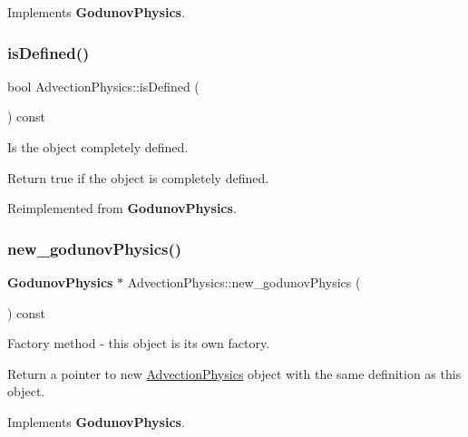 Implements \textbf{ Godunov\+Physics}.

\mbox{\label{class_advection_physics_a92b160c02d12974644e65dce3b7945b9}} 
\subsubsection{\texorpdfstring{is\+Defined()}{isDefined()}}
{\footnotesize\ttfamily bool Advection\+Physics\+::is\+Defined (\begin{DoxyParamCaption}{ }\end{DoxyParamCaption}) const\hspace{0.3cm}{\ttfamily [virtual]}}



Is the object completely defined. 

Return true if the object is completely defined. 

Reimplemented from \textbf{ Godunov\+Physics}.

\mbox{\label{class_advection_physics_aa5be4c1a0a10aa2bbbe87fc6b032f2b4}} 
\subsubsection{\texorpdfstring{new\+\_\+godunov\+Physics()}{new\_godunovPhysics()}}
{\footnotesize\ttfamily \textbf{ Godunov\+Physics} $\ast$ Advection\+Physics\+::new\+\_\+godunov\+Physics (\begin{DoxyParamCaption}{ }\end{DoxyParamCaption}) const\hspace{0.3cm}{\ttfamily [virtual]}}



Factory method -\/ this object is its own factory. 

Return a pointer to new \hyperlink{class_advection_physics}{Advection\+Physics} object with the same definition as this object. 

Implements \textbf{ Godunov\+Physics}.

\mbox{\label{class_advection_physics_ab139a3b1201a76e97e918381c5b3ff98}} 
